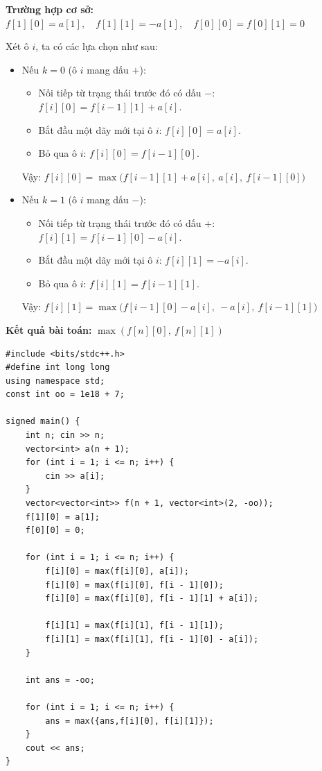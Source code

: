 \textbf{Trường hợp cơ sở:} $f[1][0] = a[1], \quad f[1][1] = -a[1], \quad f[0][0] = f[0][1] = 0$

Xét ô $i$, ta có các lựa chọn như sau:

\begin{itemize}
    \item Nếu $k = 0$ (ô $i$ mang dấu $+$):
    \begin{itemize}
        \item Nối tiếp từ trạng thái trước đó có dấu $-$: $f[i][0] = f[i-1][1] + a[i]$.
        \item Bắt đầu một dãy mới tại ô $i$: $f[i][0] = a[i]$.
        \item Bỏ qua ô $i$: $f[i][0] = f[i-1][0]$.
    \end{itemize}
    Vậy: $f[i][0] = \max \big( f[i-1][1] + a[i],\ a[i],\ f[i-1][0] \big)$

    \item Nếu $k = 1$ (ô $i$ mang dấu $-$):
    \begin{itemize}
        \item Nối tiếp từ trạng thái trước đó có dấu $+$: $f[i][1] = f[i-1][0] - a[i]$.
        \item Bắt đầu một dãy mới tại ô $i$: $f[i][1] = -a[i]$.
        \item Bỏ qua ô $i$: $f[i][1] = f[i-1][1]$.
    \end{itemize}
    Vậy: $f[i][1] = \max \big( f[i-1][0] - a[i],\ -a[i],\ f[i-1][1] \big)$
\end{itemize}

\textbf{Kết quả bài toán:}  $\max(f[n][0],\ f[n][1])$

\begin{lstlisting}[title=\centering\textbf{Cài đặt}]
#include <bits/stdc++.h>
#define int long long
using namespace std;
const int oo = 1e18 + 7;

signed main() {
    int n; cin >> n;
    vector<int> a(n + 1);
    for (int i = 1; i <= n; i++) {
        cin >> a[i];
    }
    vector<vector<int>> f(n + 1, vector<int>(2, -oo));
    f[1][0] = a[1];
    f[0][0] = 0;

    for (int i = 1; i <= n; i++) {
        f[i][0] = max(f[i][0], a[i]);
        f[i][0] = max(f[i][0], f[i - 1][0]);
        f[i][0] = max(f[i][0], f[i - 1][1] + a[i]);
        
        f[i][1] = max(f[i][1], f[i - 1][1]);
        f[i][1] = max(f[i][1], f[i - 1][0] - a[i]);
    }

    int ans = -oo;

    for (int i = 1; i <= n; i++) {
        ans = max({ans,f[i][0], f[i][1]});
    }
    cout << ans;
}
\end{lstlisting}


